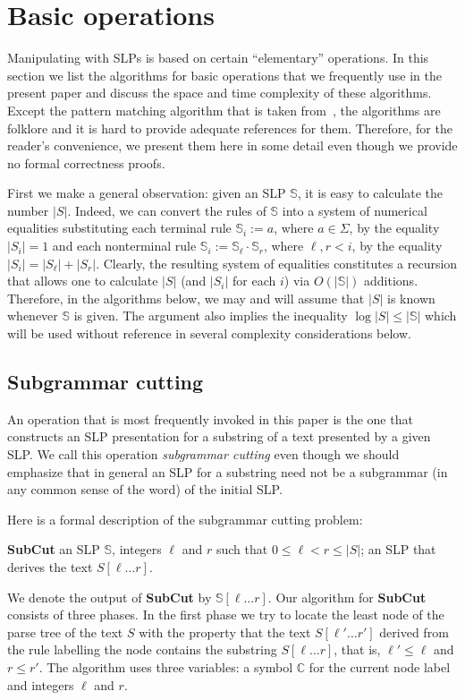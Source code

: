 \documentclass[11pt]{article}
\theoremstyle{break}
\newcommand{\slp}[1]{\mathbb{#1}}
\newcommand{\substr}[2]{[#1\dots#2]}
\newcommand{\problem}[3]{\smallskip
            \noindent {\sc Problem:} \textbf{#1} \newline
            \noindent {\sc Input:} #2 \newline
            \noindent {\sc Output:} #3
\smallskip}
\begin{document}
\section{Basic operations}

Manipulating with SLPs is based on certain ``elementary'' operations. In this section we list the algorithms for basic operations that we
frequently use in the present paper and discuss the space and time complexity of these algorithms. Except the pattern matching algorithm
that is taken from~\cite{15}, the algorithms are folklore and it is hard to provide adequate references for them. Therefore, for the
reader's convenience, we present them here in some detail even though we provide no formal correctness proofs.

First we make a general observation: given an SLP $\slp{S}$, it is easy to calculate the number $|S|$. Indeed, we can convert the rules of
$\slp{S}$ into a system of numerical equalities substituting each terminal rule $\slp{S}_i:=a$, where $a\in\Sigma$, by the equality
$|S_i|=1$ and each nonterminal rule $\slp{S}_i:=\slp{S}_\ell\cdot \slp{S}_r$, where $\ell,r<i$, by the equality $|S_i|=|S_\ell|+|S_r|$.
Clearly, the resulting system of equalities constitutes a recursion that allows one to calculate $|S|$ (and $|S_i|$ for each $i$) via
$O(|\slp{S}|)$ additions. Therefore, in the algorithms below, we may and will assume that $|S|$ is known whenever $\slp{S}$ is given. The
argument also implies the inequality $\log|S|\le|\slp{S}|$ which will be used without reference in several complexity considerations below.

\subsection{Subgrammar cutting}

An operation that is most frequently invoked in this paper is the one that constructs an SLP presentation for a substring of a text
presented by a given SLP. We call this operation \emph{subgrammar cutting} even though we should emphasize that in general an SLP for a
substring need not be a subgrammar (in any common sense of the word) of the initial SLP.

Here is a formal description of the subgrammar cutting problem:

\problem{SubCut}{an SLP $\slp{S}$, integers $\ell$ and $r$ such that $0 \leq \ell < r \leq |S|$;}{an SLP that derives the text
$S\substr{\ell}{r}$.}

We denote the output of \textbf{SubCut} by $\slp{S}\substr{\ell}{r}$. Our algorithm for \textbf{SubCut} consists of three phases. In the
first phase we try to locate the least node of the parse tree of the text $S$ with the property that the text $S\substr{\ell'}{r'}$ derived
from the rule labelling the node contains the substring $S\substr{\ell}{r}$, that is, $\ell'\le\ell$ and $r\le r'$. The algorithm uses
three variables: a symbol $\slp{C}$ for the current node label and integers $\ell$ and $r$.
\end{document}
